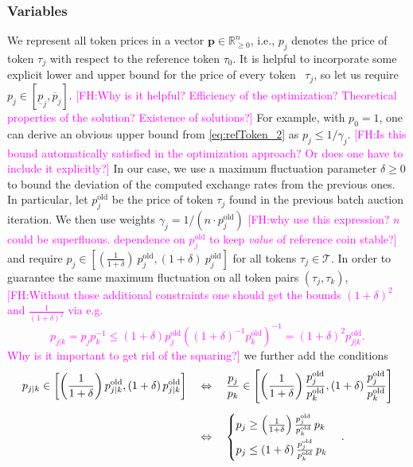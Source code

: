 \documentclass[11pt,parskip=full]{scrartcl}%
\newcommand*{\ie}{i.e., }
\newcommand*{\wrt}{with respect to }
\newcommand*{\tokens}{\mathcal{T}}          %
\newcommand{\FH}[1]{\textcolor{magenta}{[FH:#1]}}
\begin{document}
\subsubsection*{Variables}

We represent all token prices in a vector $ \mathbf{p} \in \mathbb{R}^n_{\ge 0} $, \ie $ p_j $
denotes the price of token $ \tau_j $ \wrt the reference token $ \tau_0 $.
It is helpful to incorporate some explicit lower and upper bound for the price of every token~
$ \tau_j $, so let us require $ p_j \in [\underline{p}_j,\overline{p}_j] $.
\FH{Why is it helpful? Efficiency of the optimization? Theoretical properties of the solution? Existence of solutions?}
For example, with $ p_0 = 1 $, one can derive an obvious upper bound from \eqref{eq:refToken_2} as
$ p_j \le 1/\gamma_j $.
\FH{Is this bound automatically satisfied in the optimization approach? Or does one have to include it explicitly?}
In our case, we use a maximum fluctuation parameter $ \delta \ge 0 $ to bound the deviation of the
computed exchange rates from the previous ones.
In particular, let $ p^\mathrm{old}_j $ be the price of token $ \tau_j $ found in the previous
batch auction iteration.
We then use weights $ \gamma_j = 1 / (n \cdot p^\mathrm{old}_j) $ \FH{why use this expression? $n$ could be superfluous. dependence on $p^\mathrm{old}_j$ to keep \emph{value} of reference coin stable?} and require
$ p_j \in [(\frac{1} {1+\delta}) \> p^\mathrm{old}_j, (1+\delta) \> p^\mathrm{old}_j] $
for all tokens $ \tau_j \in \tokens $.
In order to guarantee the same maximum fluctuation on all token pairs $ (\tau_j,\tau_k) $, \FH{Without those additional constraints one should get the bounds $(1 + \delta)^2$ and $\frac{1}{(1 + \delta)^2}$ via e.g.
\[
  p_{j|k} = p_j p_k^{-1} \leq (1 + \delta) p^\mathrm{old}_j ((1 + \delta)^{-1} p^\mathrm{old}_k)^{-1} = (1 + \delta)^2 p^\mathrm{old}_{j|k}.
\]
Why is it important to get rid of the squaring?}
we further add the conditions
\begin{align}
  p_{j|k} \in
  \left[
    \left(\frac{1}{1+\delta}\right) p^\mathrm{old}_{j|k},
    (1+\delta) \, p^\mathrm{old}_{j|k}
  \right]
  \quad &\Leftrightarrow \quad
  \frac{p_j}{p_k} \in
  \left[
    \left(\frac{1}{1+\delta}\right) \frac{p^\mathrm{old}_j}{p^\mathrm{old}_k},
    (1+\delta) \, \frac{p^\mathrm{old}_j}{p^\mathrm{old}_k}
  \right]\notag\\[2mm]
  \quad &\Leftrightarrow \quad
  \begin{cases}
    p_j \ge \left(\frac{1}{1+\delta}\right) \frac{p^\mathrm{old}_j}{p^\mathrm{old}_k} \, p_k
    \\[2mm]
    p_j \le \left(1+\delta\right) \frac{p^\mathrm{old}_j}{p^\mathrm{old}_k} \, p_k
  \end{cases}.
\end{align}
\end{document}
